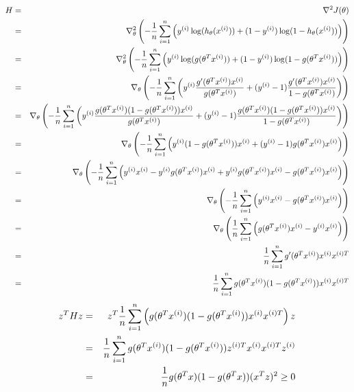 \begin{answer}
\begin{eqnarray*}
H&=&\nabla^2J(\theta)\\
&=&\nabla_\theta^2\left(-\frac{1}{{n}}\sum_{i=1}^{n}\left(y^{(i)}\log(h_{\theta}(x^{(i)}))+(1-y^{(i)})\log(1-h_{\theta}(x^{(i)}))\right)\right)\\
&=&\nabla_\theta^2\left(-\frac{1}{{n}}\sum_{i=1}^{n}\left(y^{(i)}\log(g(\theta^T x^{(i)}))+(1-y^{(i)})\log(1-g(\theta^T x^{(i)}))\right)\right)\\
&=&\nabla_\theta\left(-\frac{1}{{n}}\sum_{i=1}^{n}\left(y^{(i)}\frac{g'(\theta^T x^{(i)})x^{(i)}}{g(\theta^T x^{(i)})}+(y^{(i)}-1)\frac{g'(\theta^T x^{(i)})x^{(i)}}{1-g(\theta^T x^{(i)})}\right)\right)\\
&=&\nabla_\theta\left(-\frac{1}{{n}}\sum_{i=1}^{n}\left(y^{(i)}\frac{g(\theta^T x^{(i)})(1-g(\theta^T x^{(i)}))x^{(i)}}{g(\theta^T x^{(i)})}+(y^{(i)}-1)\frac{g(\theta^T x^{(i)})(1-g(\theta^T x^{(i)}))x^{(i)}}{1-g(\theta^T x^{(i)})}\right)\right)\\
&=&\nabla_\theta\left(-\frac{1}{{n}}\sum_{i=1}^{n}\left(y^{(i)}(1-g(\theta^T x^{(i)}))x^{(i)}+(y^{(i)}-1)g(\theta^T x^{(i)})x^{(i)}\right)\right)\\
&=&\nabla_\theta\left(-\frac{1}{{n}}\sum_{i=1}^{n}\left(y^{(i)}x^{(i)}-y^{(i)}g(\theta^T x^{(i)})x^{(i)}+y^{(i)}g(\theta^T x^{(i)})x^{(i)}-g(\theta^T x^{(i)})x^{(i)}\right)\right)\\
&=&\nabla_\theta\left(-\frac{1}{{n}}\sum_{i=1}^{n}\left(y^{(i)}x^{(i)}-g(\theta^T x^{(i)})x^{(i)}\right)\right)\\
&=&\nabla_\theta\left(\frac{1}{{n}}\sum_{i=1}^{n}\left(g(\theta^T x^{(i)})x^{(i)}-y^{(i)}x^{(i)}\right)\right)\\
&=&\frac{1}{{n}}\sum_{i=1}^{{n}}g'(\theta^T x^{(i)})x^{(i)}x^{(i)T}\\
&=&\frac{1}{{n}}\sum_{i=1}^{{n}}g(\theta^T x^{(i)})(1-g(\theta^T x^{(i)}))x^{(i)}x^{(i)T}\\
\end{eqnarray*}
\begin{eqnarray*}
z^THz&=&z^T\frac{1}{{n}}\sum_{i=1}^{n}\left(g(\theta^T x^{(i)})(1-g(\theta^T x^{(i)}))x^{(i)}x^{(i)T}\right)z\\
&=&\frac{1}{{n}}\sum_{i=1}^{{n}}g(\theta^T x^{(i)})(1-g(\theta^T x^{(i)}))z^{(i)T}x^{(i)}x^{(i)T}z^{(i)}\\
&=&\frac{1}{{n}}g(\theta^T x)(1-g(\theta^T x))(x^{T}z)^2\geq0\\
\end{eqnarray*}
\end{answer}
